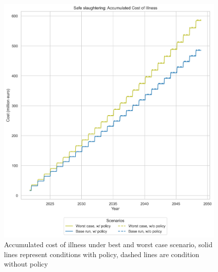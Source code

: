 \begin{figure}[h!]
    \centering
    \begin{minipage}{0.45\textwidth}
        \centering
        \includegraphics[width=1\textwidth]{images/ss_Base and Worst Case_acoi.png}
        \caption{Accumulated cost of illness under best and worst case scenario, solid lines represent conditions with policy, dashed lines are condition without policy}
        \label{fig:ss_bwc_acoi}
    \end{minipage}\hfill
    \begin{minipage}{0.45\textwidth}
        \centering

\end{minipage}
\end{figure}
